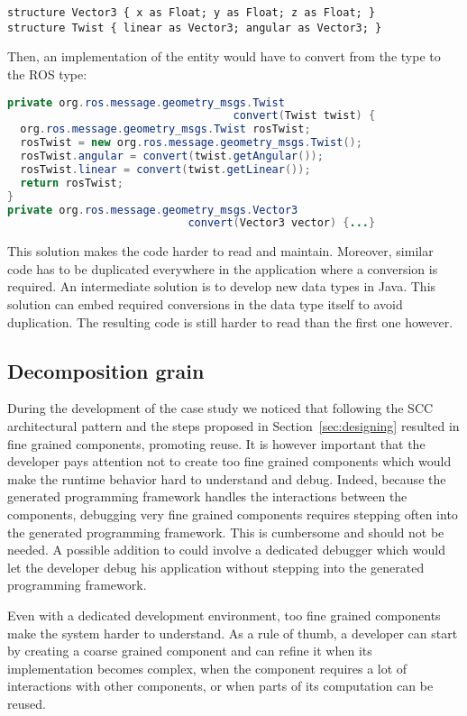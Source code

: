 \begin{lstlisting}[language=diaspec, numbers=none]
structure Vector3 { x as Float; y as Float; z as Float; }
structure Twist { linear as Vector3; angular as Vector3; }
\end{lstlisting}

Then, an implementation of the  entity would have to convert
from the \diaspec{}  type to the ROS  type:

\begin{lstlisting}[language=java, numbers=none]
private org.ros.message.geometry_msgs.Twist
                                   convert(Twist twist) {
  org.ros.message.geometry_msgs.Twist rosTwist;
  rosTwist = new org.ros.message.geometry_msgs.Twist();
  rosTwist.angular = convert(twist.getAngular());
  rosTwist.linear = convert(twist.getLinear());
  return rosTwist;
}
private org.ros.message.geometry_msgs.Vector3
                            convert(Vector3 vector) {...}
\end{lstlisting}

This solution makes the code harder to read and maintain. Moreover,
similar code has to be duplicated everywhere in the application where
a conversion is required. An intermediate solution is to develop new
data types in Java. This solution can embed required conversions in
the data type itself to avoid duplication. The resulting code is still
harder to read than the first one however.

\subsection{Decomposition grain}

During the development of the case study we noticed that following the
SCC architectural pattern and the steps proposed in
Section~\ref{sec:designing} resulted in fine grained components,
promoting reuse. It is however important that the developer pays
attention not to create too fine grained components which would make
the runtime behavior hard to understand and debug. Indeed, because the
generated programming framework handles the interactions between the
components, debugging very fine grained components requires stepping
often into the generated programming framework. This is cumbersome and
should not be needed. A possible addition to \diaspec{} could involve
a dedicated debugger which would let the developer debug his
application without stepping into the generated programming framework.

Even with a dedicated development environment, too fine grained
components make the system harder to understand. As a rule of thumb, a
developer can start by creating a coarse grained component and can
refine it when its implementation becomes complex, when the component
requires a lot of interactions with other components, or when parts
of its computation can be reused.

